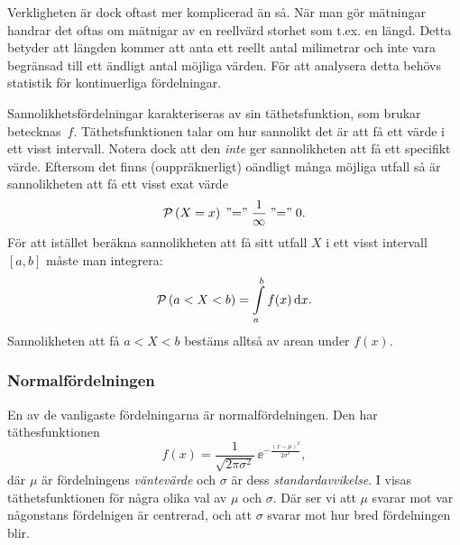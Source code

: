 \documentclass[11pt,a4paper, english, swedish
]{article}
\newcommand{\PP}[1]{\ensuremath\mathcal{P}\left(#1\right)}
\begin{document}
Verkligheten är dock oftast mer komplicerad än så. När man gör
mätningar handrar det oftas om mätnigar av en reellvärd
storhet som t.ex. en längd\footnotemark{}. Detta betyder att längden
kommer att anta ett reellt antal milimetrar och inte vara begränsad
till ett ändligt antal möjliga värden. För att analysera detta behövs
statistik för kontinuerliga fördelningar. 

Sannolikhetsfördelningar karakteriseras av sin täthetsfunktion, som
brukar betecknas~$f$. Täthetsfunktionen talar om hur sannolikt det är
att få ett värde i ett visst intervall. Notera dock att den
\emph{inte} ger sannolikheten att få ett specifikt värde. 
Eftersom det finns (ouppräknerligt) oändligt många möjliga utfall så
är sannolikheten att få ett visst exat värde
\begin{equation}
\PP{X=x}\; \text{''=''}\; \frac{1}{\infty}\; \text{''=''}\;0.
\end{equation}
För att istället beräkna sannolikheten att få sitt utfall $X$ i ett
visst intervall $[a, b]$ måste man integrera:
\begin{equation}
\PP{a<X<b} = \int_a^b f(x) \id{x}.
\end{equation}
Sannolikheten att få $a<X<b$ bestäms alltså av arean under $f(x)$.



\subsubsection{Normalfördelningen}
En av de vanligaste fördelningarna är normalfördelningen. Den
har täthesfunktionen
\begin{equation}
f(x) = \frac{1}{\sqrt{2\pi\sigma^2}} \, \ee^{-\frac{(x-\mu)^2}{2\sigma^2}},
\end{equation}
där $\mu$ är fördelningens \emph{väntevärde} och $\sigma$ är dess
\emph{standardavvikelse}. I  visas
täthetsfunktionen för några olika val av $\mu$ och $\sigma$. Där ser
vi att $\mu$ svarar mot var någonstans fördelnigen är centrerad, och
att $\sigma$ svarar mot hur bred fördelningen blir. 
\end{document}
